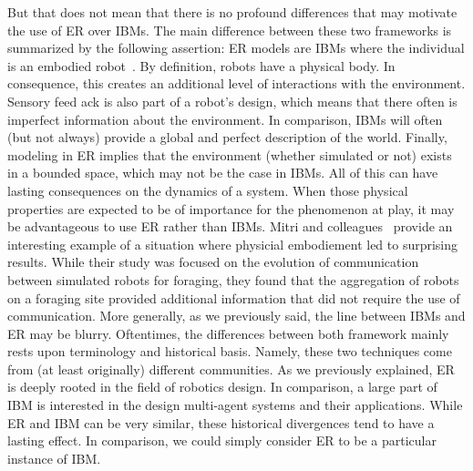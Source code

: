     But that does not mean that there is no profound differences that may motivate the use of ER over IBMs. The main difference between these two frameworks is summarized by the following assertion: ER models are IBMs where the individual is an embodied robot~\parencite{Mitri2012}. By definition, robots have a physical body. In consequence, this creates an additional level of interactions with the environment. Sensory feed ack is also part of a robot's design, which means that there often is imperfect information about the environment. In comparison, IBMs will often (but not always) provide a global and perfect description of the world. Finally, modeling in ER implies that the environment (whether simulated or not) exists in a bounded space, which may not be the case in IBMs. All of this can have lasting consequences on the dynamics of a system. When those physical properties are expected to be of importance for the phenomenon at play, it may be advantageous to use ER rather than IBMs. Mitri and colleagues~\parencite{Mitri2009} provide an interesting example of a situation where physicial embodiement led to surprising results. While their study was focused on the evolution of communication between simulated robots for foraging, they found that the aggregation of robots on a foraging site provided additional information that did not require the use of communication. More generally, as we previously said, the line between IBMs and ER may be blurry. Oftentimes, the differences between both framework mainly rests upon terminology and historical basis. Namely, these two techniques come from (at least originally) different communities. As we previously explained, ER is deeply rooted in the field of robotics design. In comparison, a large part of IBM is interested in the design multi-agent systems and their applications. While ER and IBM can be very similar, these historical divergences tend to have a lasting effect. In comparison, we could simply consider ER to be a particular instance of IBM.

